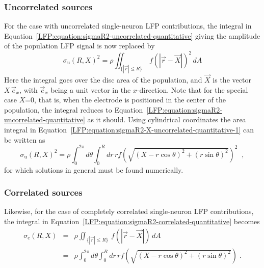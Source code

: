 \subsubsection{Uncorrelated sources} 
For the case with uncorrelated single-neuron LFP contributions, the integral in Equation~\ref{LFP:equation:sigmaR2-uncorrelated-quantitative}
giving the amplitude of the population LFP signal is now replaced by~\cite{Einevoll2013a} 
\begin{equation}
\sigma_\text{u}(R,X)^2 =  \rho \iint_{\{|\vec{r}|\le R\}}\, f(|\vec{r}-\vec{X}|)^2  \, dA 
\label{LFP:equation:sigmaR2-X-uncorrelated-quantitative-1}
\end{equation}
Here the integral goes over the disc area of the population, and $\vec{X}$ is the vector $X\,\vec{e}_x$, 
with $\vec{e}_x$ being a unit vector in the $x$-direction. Note that for the special case $X$=0, that is, when
the electrode is positioned in the center of the population, the integral reduces to 
Equation~\ref{LFP:equation:sigmaR2-uncorrelated-quantitative} as it should.
Using cylindrical coordinates the area integral in Equation~\ref{LFP:equation:sigmaR2-X-uncorrelated-quantitative-1} 
can be written as
\begin{equation}
\sigma_\text{u}(R,X)^2 
           =  \rho \int_0^{2\pi} d\theta \int_0^R dr \, r f \left( \sqrt{(X-r\cos\theta)^2+(r\sin\theta)^2} \right)^2\;\;, 
\label{LFP:equation:sigmaR2-X-uncorrelated-quantitative}
\end{equation}
for which solutions in general must be found numerically. 

\subsubsection{Correlated sources} 
Likewise, for the case of completely correlated single-neuron LFP contributions, 
the integral in Equation~\ref{LFP:equation:sigmaR2-correlated-quantitative} becomes
\begin{eqnarray}
  \sigma_\text{c}(R,X) & = &  \rho \iint_{\{|\vec{r}|\le R\}} \, f(|\vec{r}-\vec{X}|)   \, dA \nonumber \\
           & = &  \rho \int_0^{2\pi} d\theta \int_0^R dr \, r f \left( \sqrt{(X-r\cos\theta)^2+(r\sin\theta)^2}\right) \;.
\label{LFP:equation:sigmaR2-X-correlated-quantitative}           
\end{eqnarray}

